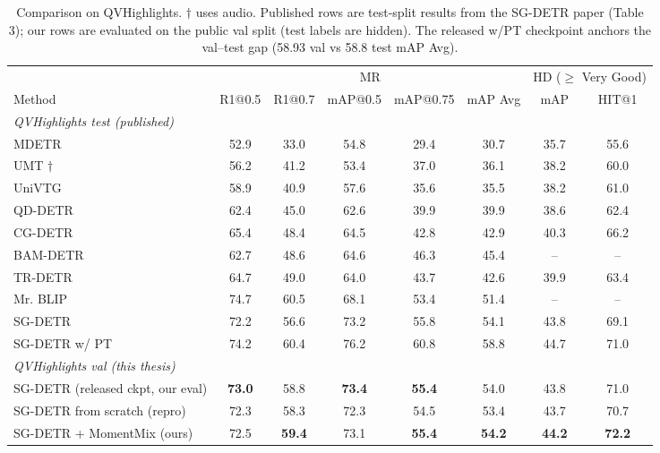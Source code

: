 \begin{table}[t]
\centering
\small
\begin{tabular}{l cc cc c cc}
\toprule
 & \multicolumn{5}{c}{MR} & \multicolumn{2}{c}{HD ($\geq$ Very Good)} \\
\cmidrule(lr){2-6} \cmidrule(lr){7-8}
Method & R1@0.5 & R1@0.7 & mAP@0.5 & mAP@0.75 & mAP Avg & mAP & HIT@1 \\
\midrule
\multicolumn{8}{l}{\textit{QVHighlights test (published)}} \\
MDETR & 52.9 & 33.0 & 54.8 & 29.4 & 30.7 & 35.7 & 55.6 \\
UMT $\dagger$ & 56.2 & 41.2 & 53.4 & 37.0 & 36.1 & 38.2 & 60.0 \\
UniVTG & 58.9 & 40.9 & 57.6 & 35.6 & 35.5 & 38.2 & 61.0 \\
QD-DETR & 62.4 & 45.0 & 62.6 & 39.9 & 39.9 & 38.6 & 62.4 \\
CG-DETR & 65.4 & 48.4 & 64.5 & 42.8 & 42.9 & 40.3 & 66.2 \\
BAM-DETR & 62.7 & 48.6 & 64.6 & 46.3 & 45.4 & -- & -- \\
TR-DETR & 64.7 & 49.0 & 64.0 & 43.7 & 42.6 & 39.9 & 63.4 \\
Mr. BLIP & 74.7 & 60.5 & 68.1 & 53.4 & 51.4 & -- & -- \\
SG-DETR & 72.2 & 56.6 & 73.2 & 55.8 & 54.1 & 43.8 & 69.1 \\
SG-DETR w/ PT & 74.2 & 60.4 & 76.2 & 60.8 & 58.8 & 44.7 & 71.0 \\
\midrule
\multicolumn{8}{l}{\textit{QVHighlights val (this thesis)}} \\
SG-DETR (released ckpt, our eval) & \textbf{73.0} & 58.8 & \textbf{73.4} & \textbf{55.4} & 54.0 & 43.8 & 71.0 \\
SG-DETR from scratch (repro) & 72.3 & 58.3 & 72.3 & 54.5 & 53.4 & 43.7 & 70.7 \\
SG-DETR + MomentMix (ours) & 72.5 & \textbf{59.4} & 73.1 & \textbf{55.4} & \textbf{54.2} & \textbf{44.2} & \textbf{72.2} \\
\bottomrule
\end{tabular}
\caption{Comparison on QVHighlights. $\dagger$ uses audio. Published rows are
test-split results from the SG-DETR paper (Table 3); our rows are evaluated on
the public val split (test labels are hidden). The released w/PT checkpoint
anchors the val--test gap (58.93 val vs 58.8 test mAP Avg).}
\label{tab:qvh-benchmark}
\end{table}
